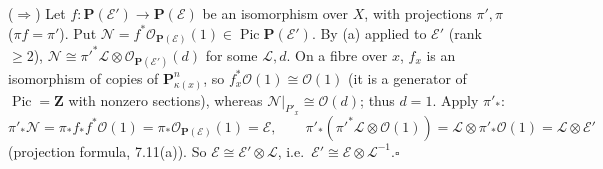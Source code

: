 \documentclass[11pt]{article}
\begin{document}
($\Rightarrow$) Let $f:\mathbf P(\mathcal E')\to\mathbf P(\mathcal E)$ be an isomorphism over $X$, with projections $\pi',\pi$ ($\pi f=\pi'$). Put $\mathcal N=f^*\mathcal O_{\mathbf P(\mathcal E)}(1)\in\operatorname{Pic}\mathbf P(\mathcal E')$. By (a) applied to $\mathcal E'$ (rank $\ge2$), $\mathcal N\cong\pi'^*\mathcal L\otimes\mathcal O_{\mathbf P(\mathcal E')}(d)$ for some $\mathcal L,d$. On a fibre over $x$, $f_x$ is an isomorphism of copies of $\mathbf P^n_{\kappa(x)}$, so $f_x^*\mathcal O(1)\cong\mathcal O(1)$ (it is a generator of $\operatorname{Pic}=\mathbf Z$ with nonzero sections), whereas $\mathcal N|_{P'_x}\cong\mathcal O(d)$; thus $d=1$. Apply $\pi'_*$:
\[
\pi'_*\mathcal N=\pi_*f_*f^*\mathcal O(1)=\pi_*\mathcal O_{\mathbf P(\mathcal E)}(1)=\mathcal E,\qquad \pi'_*(\pi'^*\mathcal L\otimes\mathcal O(1))=\mathcal L\otimes\pi'_*\mathcal O(1)=\mathcal L\otimes\mathcal E'
\]
(projection formula, 7.11(a)). So $\mathcal E\cong\mathcal E'\otimes\mathcal L$, i.e.\ $\mathcal E'\cong\mathcal E\otimes\mathcal L^{-1}$.\hfill$\square$
\end{document}
